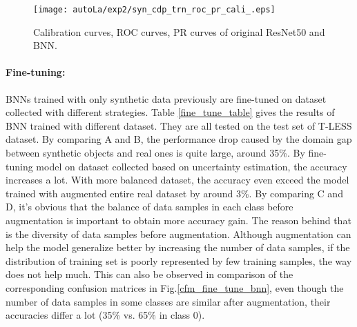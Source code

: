 \begin{figure}[H]
	\begin{center}
		\texttt{[image: autoLa/exp2/syn\_cdp\_trn\_roc\_pr\_cali\_.eps]}
		\caption{Calibration curves, ROC curves, PR curves of original ResNet50 and \gls{BNN}.}		
		\label{autoLa_exp2_cali}
	\end{center}
\end{figure}


\paragraph{Fine-tuning:} \gls{BNN}s trained with only synthetic data previously are fine-tuned on dataset collected with different strategies. Table \ref{fine_tune_table} gives the results of \gls{BNN} trained with different dataset. They are all tested on the test set of T-LESS dataset. By comparing A and B, the performance drop caused by the domain gap between synthetic objects and real ones is quite large, around 35\%. By fine-tuning model on dataset collected based on uncertainty estimation, the accuracy increases a lot. With more balanced dataset, the accuracy even exceed the model trained with augmented entire real dataset by around 3\%. By comparing C and D, it's obvious that the balance of data samples in each class before augmentation is important to obtain more accuracy gain. The reason behind that is the diversity of data samples before augmentation. Although augmentation can help the model generalize better by increasing the number of data samples, if the distribution of training set is poorly represented by few training samples, the way does not help much. This can also be observed in comparison of the corresponding confusion matrices in Fig.\ref{cfm_fine_tune_bnn}, even though the number of data samples in some classes are similar after augmentation, their accuracies differ a lot (35\% vs. 65\% in class 0).

